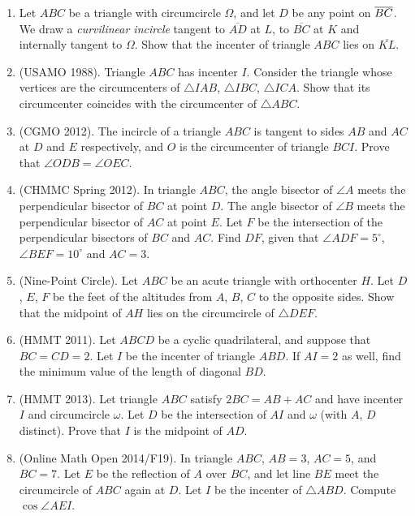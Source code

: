 \documentclass[12pt]{scrartcl}
\begin{document}
\begin{enumerate}[resume]
\item Let $ABC$ be a triangle with circumcircle $\Omega$, and let $D$ be any point on $\overline{BC}$. We draw a \emph{curvilinear incircle} tangent to $\overline{AD}$ at $L$, to $\overline{BC}$ at $K$ and internally tangent to $\Omega$. Show that the incenter of triangle $ABC$ lies on $\overline{KL}$.

\item (USAMO 1988). Triangle $ABC$ has incenter $I$. Consider the triangle whose vertices are the circumcenters of $\triangle IAB$, $\triangle IBC$, $\triangle ICA$. Show that its circumcenter coincides with the circumcenter of $\triangle ABC$.

\item (CGMO 2012). The incircle of a triangle $ABC$ is tangent to sides $AB$ and $AC$ at $D$ and $E$ respectively, and $O$ is the circumcenter of triangle $BCI$. Prove that $\angle ODB = \angle OEC$.

\item (CHMMC Spring 2012). In triangle $ABC$, the angle bisector of $\angle A$ meets the perpendicular bisector of $BC$ at point $D$. The angle bisector of $\angle B$ meets the perpendicular bisector of $AC$ at point $E$. Let $F$ be the intersection of the perpendicular bisectors of $BC$ and $AC$. Find $DF$, given that $\angle ADF = 5^\circ$, $\angle BEF = 10^\circ$ and $AC = 3$.

\item (Nine-Point Circle). Let $ABC$ be an acute triangle with orthocenter $H$. Let $D$, $E$, $F$ be the feet of the altitudes from $A$, $B$, $C$ to the opposite sides. Show that the midpoint of $AH$ lies on the circumcircle of $\triangle DEF$.

\item (HMMT 2011). Let $ABCD$ be a cyclic quadrilateral, and suppose that $BC = CD = 2$. Let $I$ be the incenter of triangle $ABD$. If $AI = 2$ as well, find the minimum value of the length of diagonal $BD$.

\item (HMMT 2013). Let triangle $ABC$ satisfy $2BC = AB + AC$ and have incenter $I$ and circumcircle $\omega$. Let $D$ be the intersection of $AI$ and $\omega$ (with $A$, $D$ distinct). Prove that $I$ is the midpoint of $AD$.

\item (Online Math Open 2014/F19). In triangle $ABC$, $AB = 3$, $AC = 5$, and $BC = 7$. Let $E$ be the reflection of $A$ over $BC$, and let line $BE$ meet the circumcircle of $ABC$ again at $D$. Let $I$ be the incenter of $\triangle ABD$. Compute $\cos \angle AEI$.


\end{enumerate}
\end{document}

